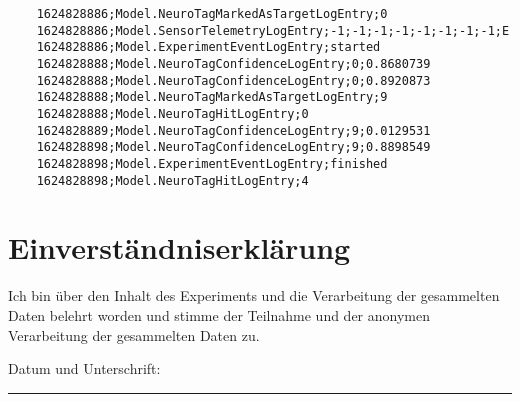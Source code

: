 \documentclass[a4paper,10pt,oneside,headsepline]{scrartcl}
\newcommand{\Qline}[1]{\noindent\rule{#1}{0.6pt}}
\begin{document}
\begin{lstlisting}
    1624828886;Model.NeuroTagMarkedAsTargetLogEntry;0
    1624828886;Model.SensorTelemetryLogEntry;-1;-1;-1;-1;-1;-1;-1;-1;E
    1624828886;Model.ExperimentEventLogEntry;started
    1624828888;Model.NeuroTagConfidenceLogEntry;0;0.8680739
    1624828888;Model.NeuroTagConfidenceLogEntry;0;0.8920873
    1624828888;Model.NeuroTagMarkedAsTargetLogEntry;9
    1624828888;Model.NeuroTagHitLogEntry;0
    1624828889;Model.NeuroTagConfidenceLogEntry;9;0.0129531
    1624828898;Model.NeuroTagConfidenceLogEntry;9;0.8898549
    1624828898;Model.ExperimentEventLogEntry;finished
    1624828898;Model.NeuroTagHitLogEntry;4
\end{lstlisting}

\bigskip

\section*{Einverständniserklärung}

Ich bin über den Inhalt des Experiments und die Verarbeitung der gesammelten Daten belehrt worden und stimme der Teilnahme und der anonymen Verarbeitung der gesammelten Daten zu.

\bigskip
\bigskip
\bigskip


\noindent Datum und Unterschrift: \Qline{10cm}
\end{document}
